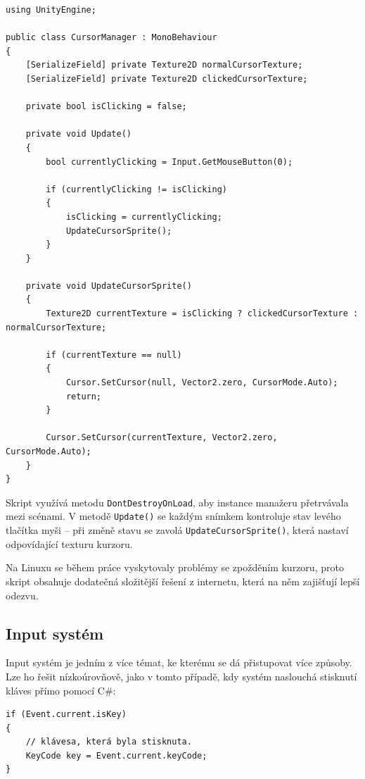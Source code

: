 \begin{lstlisting}[caption={CursorManager.cs}, label={lst:CursorManager}, frame=none, backgroundcolor=\color{white}]
using UnityEngine;

public class CursorManager : MonoBehaviour
{
    [SerializeField] private Texture2D normalCursorTexture;
    [SerializeField] private Texture2D clickedCursorTexture;

    private bool isClicking = false;

    private void Update()
    {
        bool currentlyClicking = Input.GetMouseButton(0);
        
        if (currentlyClicking != isClicking)
        {
            isClicking = currentlyClicking;
            UpdateCursorSprite();
        }
    }

    private void UpdateCursorSprite()
    {
        Texture2D currentTexture = isClicking ? clickedCursorTexture : normalCursorTexture;
        
        if (currentTexture == null)
        {
            Cursor.SetCursor(null, Vector2.zero, CursorMode.Auto);
            return;
        }
        
        Cursor.SetCursor(currentTexture, Vector2.zero, CursorMode.Auto);
    }
}
\end{lstlisting}

Skript využívá metodu \texttt{DontDestroyOnLoad}, aby instance manažeru přetrvávala mezi scénami. V metodě \texttt{Update()} se každým snímkem kontroluje stav levého tlačítka myši – při změně stavu se zavolá \texttt{UpdateCursorSprite()}, která nastaví odpovídající texturu kurzoru.

Na Linuxu se během práce vyskytovaly problémy se zpožděním kurzoru, proto skript obsahuje dodatečná složitější řešení z internetu, která na něm zajišťují lepší odezvu.

\subsection{Input systém}
\label{sec:input-system}

Input systém je jedním z více témat, ke kterému se dá přistupovat více způsoby. Lze ho řešit nízkoúrovňově, jako v tomto případě, kdy systém naslouchá stisknutí kláves přímo pomocí C\#:

\begin{lstlisting}[caption={Nízkoúrovňové zpracování vstupu}, label={lst:low-level-input}]
if (Event.current.isKey)
{
    // klávesa, která byla stisknuta.
    KeyCode key = Event.current.keyCode;
}
\end{lstlisting}

